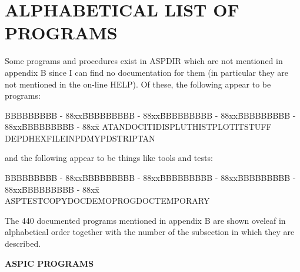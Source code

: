 \section {ALPHABETICAL LIST OF PROGRAMS}

Some programs and procedures exist in ASPDIR which are not mentioned in appendix
B since I can find no documentation for them (in particular they are not
mentioned in the on-line HELP).
Of these, the following appear to be programs:\\
\vspace{20mm}
{\scriptsize
\begin{tabbing}
BBBBBBBBB - 88xx\=BBBBBBBBB - 88xx\=BBBBBBBBB - 88xx\=BBBBBBBBB - 88xx\=BBBBBBBBB - 88xx\=\kill
ATAN\>DOCIT\>IDISP\>LUTHIST\>PLOTIT\>STUFF\\
DEPD\>HEXFILE\>INPD\>MYPD\>STRIP\>TAN
\end{tabbing}}
\vspace{20mm}
and the following appear to be things like tools and tests:\\
\vspace{20mm}
{\scriptsize
\begin{tabbing}
BBBBBBBBB - 88xx\=BBBBBBBBB - 88xx\=BBBBBBBBB - 88xx\=BBBBBBBBB - 88xx\=BBBBBBBBB - 88xx\=\kill
ASPTEST\>COPYDOC\>DEMO\>PROGDOC\>TEMPORARY
\end{tabbing}}
\vspace{20mm}
The 440 documented programs mentioned in appendix B are shown oveleaf in
alphabetical order together with the number of the subsection in which they are
described.

\newpage
\begin{center}
{\Large\bf ASPIC PROGRAMS}
\end{center}

